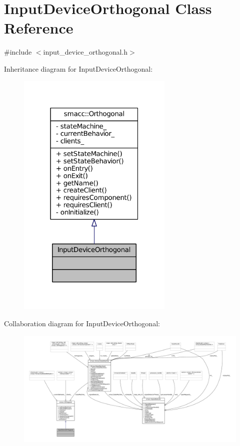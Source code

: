 \hypertarget{classInputDeviceOrthogonal}{}\section{Input\+Device\+Orthogonal Class Reference}
\label{classInputDeviceOrthogonal}


{\ttfamily \#include $<$input\+\_\+device\+\_\+orthogonal.\+h$>$}



Inheritance diagram for Input\+Device\+Orthogonal\+:
\nopagebreak
\begin{figure}[H]
\begin{center}
\leavevmode
\includegraphics[width=211pt]{classInputDeviceOrthogonal__inherit__graph}
\end{center}
\end{figure}


Collaboration diagram for Input\+Device\+Orthogonal\+:
\nopagebreak
\begin{figure}[H]
\begin{center}
\leavevmode
\includegraphics[width=350pt]{classInputDeviceOrthogonal__coll__graph}
\end{center}
\end{figure}

